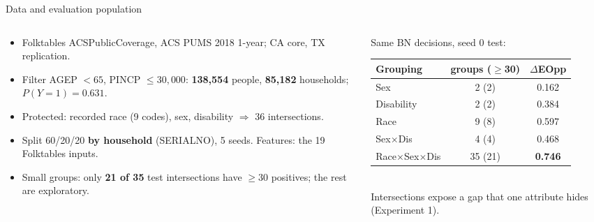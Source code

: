 \documentclass[aspectratio=169,11pt]{beamer}
\newcommand{\bad}[1]{\textcolor{red!70!black}{\textbf{#1}}}
\begin{document}
\begin{frame}{Data and evaluation population}
\begin{columns}[T]
\begin{column}{0.55\textwidth}
\begin{itemize}
\item Folktables ACSPublicCoverage, ACS PUMS 2018 1-year; CA core, TX replication.
\item Filter AGEP $<65$, PINCP $\le30{,}000$: \textbf{138,554} people, \textbf{85,182} households; $P(Y{=}1)=0.631$.
\item Protected: recorded race (9 codes), sex, disability $\Rightarrow$ 36 intersections.
\item Split 60/20/20 \textbf{by household} (SERIALNO), 5 seeds. Features: the 19 Folktables inputs.
\item Small groups: only \textbf{21 of 35} test intersections have $\ge30$ positives; the rest are exploratory.
\end{itemize}
\end{column}
\begin{column}{0.42\textwidth}
\footnotesize Same BN decisions, seed 0 test:\\[2pt]\setlength{\tabcolsep}{4pt}
\begin{tabular}{lcc}\toprule
Grouping & groups ($\ge$30) & $\Delta$EOpp\\\midrule
Sex & 2 (2) & 0.162\\
Disability & 2 (2) & 0.384\\
Race & 9 (8) & 0.597\\
Sex$\times$Dis & 4 (4) & 0.468\\
Race$\times$Sex$\times$Dis & 35 (21) & \bad{0.746}\\\bottomrule
\end{tabular}\\[4pt]
Intersections expose a gap that one attribute hides (Experiment 1).
\end{column}
\end{columns}
\end{frame}
\end{document}
